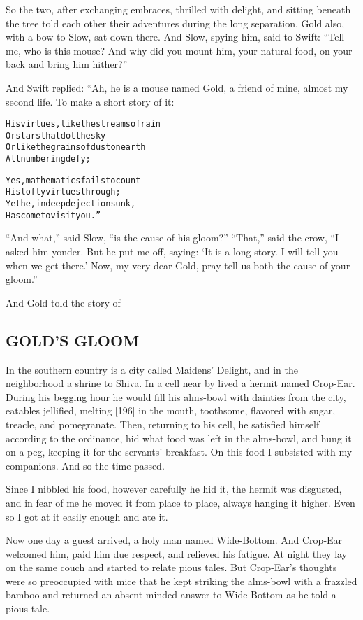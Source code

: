 \documentclass{article}
\renewenvironment{verbatim}{\begin{alltt}\normalfont\begin{centering}}{\end{centering}\end{alltt}}
\begin{document}
So the two, after exchanging embraces, thrilled with delight, and
sitting beneath the tree told each other their adventures during
the long separation. Gold also, with a bow to Slow, sat down there.
And Slow, spying him, said to Swift:
``Tell me, who is this mouse? And why did you mount him, your natural food, on your back and bring him hither?''

And Swift replied: “Ah, he is a mouse named Gold, a friend of mine,
almost my second life. To make a short story of it:

\begin{verbatim}
His virtues, like the streams of rain
    Or stars that dot the sky
Or like the grains of dust on earth
    All numbering defy;

Yes, mathematics fails to count
    His lofty virtues through;
Yet he, in deep dejection sunk,
    Has come to visit you.”
\end{verbatim}
``And what,'' said Slow, ``is the cause of his gloom?'' ``That,''
said the crow,
``I asked him yonder. But he put me off, saying: `It is a long story. I will tell you when we get there.' Now, my very dear Gold, pray tell us both the cause of your gloom.''

And Gold told the story of

\subsection{GOLD'S GLOOM}

In the southern country is a city called Maidens' Delight, and in
the neighborhood a shrine to Shiva. In a cell near by lived a
hermit named Crop-Ear. During his begging hour he would fill his
alms-bowl with dainties from the city, eatables jellified, melting
[196] in the mouth, toothsome, flavored with sugar, treacle, and
pomegranate. Then, returning to his cell, he satisfied himself
according to the ordinance, hid what food was left in the
alms-bowl, and hung it on a peg, keeping it for the servants'
breakfast. On this food I subsisted with my companions. And so the
time passed.

Since I nibbled his food, however carefully he hid it, the hermit
was disgusted, and in fear of me he moved it from place to place,
always hanging it higher. Even so I got at it easily enough and ate
it.

Now one day a guest arrived, a holy man named Wide-Bottom. And
Crop-Ear welcomed him, paid him due respect, and relieved his
fatigue. At night they lay on the same couch and started to relate
pious tales. But Crop-Ear's thoughts were so preoccupied with mice
that he kept striking the alms-bowl with a frazzled bamboo and
returned an absent-minded answer to Wide-Bottom as he told a pious
tale.
\end{document}
